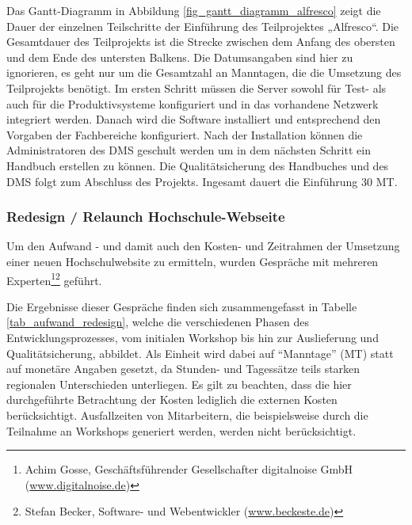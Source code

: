 Das Gantt-Diagramm in Abbildung \ref{fig_gantt_diagramm_alfresco} zeigt die Dauer der einzelnen Teilschritte der Einführung des Teilprojektes „Alfresco“. Die Gesamtdauer des Teilprojekts ist die Strecke zwischen dem Anfang des obersten und dem Ende des untersten Balkens. Die Datumsangaben sind hier zu ignorieren, es geht nur um die Gesamtzahl an Manntagen, die die Umsetzung des Teilprojekts benötigt. Im ersten Schritt müssen die Server sowohl für Test- als auch für die Produktivsysteme konfiguriert und in das vorhandene Netzwerk integriert werden. Danach wird die Software installiert und entsprechend den Vorgaben der Fachbereiche konfiguriert. Nach der Installation können die Administratoren des DMS geschult werden um in dem nächsten Schritt ein Handbuch erstellen zu können. Die Qualitätsicherung des Handbuches und des DMS folgt zum Abschluss des Projekts. Ingesamt dauert die Einführung 30 MT.

\subsubsection{Redesign / Relaunch Hochschule-Webseite}
\label{subsubsection_redesign_webseite}
Um den Aufwand - und damit auch den Kosten- und Zeitrahmen der Umsetzung einer neuen Hochschulwebsite zu ermitteln, wurden Gespräche mit mehreren Experten\footnote{Achim Gosse, Geschäftsführender Gesellschafter digitalnoise GmbH (\url{www.digitalnoise.de})}\footnote{Stefan Becker, Software- und Webentwickler (\url{www.beckeste.de})} geführt.

Die Ergebnisse dieser Gespräche finden sich zusammengefasst in Tabelle \ref{tab_aufwand_redesign}, welche die verschiedenen Phasen des Entwicklungsprozesses, vom initialen Workshop bis hin zur Auslieferung und Qualitätsicherung, abbildet. Als Einheit wird dabei auf “Manntage” (MT) statt auf monetäre Angaben gesetzt, da Stunden- und Tagessätze teils starken regionalen Unterschieden unterliegen. Es gilt zu beachten, dass die hier durchgeführte Betrachtung der Kosten lediglich die externen Kosten berücksichtigt. Ausfallzeiten von Mitarbeitern, die beispielsweise durch die Teilnahme an Workshops generiert werden, werden nicht berücksichtigt.

